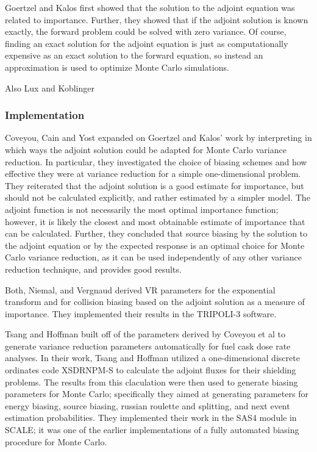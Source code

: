 Goertzel \cite{goertzel_monte_1958} and Kalos \cite{kalos_importance_1963} first
showed that the solution to the adjoint equation was related to importance.
Further, they showed that if the adjoint solution is known exactly, the forward
problem could be solved with zero variance. Of course, finding an exact solution
for the adjoint equation is just as computationally expensive as an exact
solution to the forward equation, so instead an approximation is used to
optimize Monte Carlo simulations.

Also Lux and Koblinger \cite{lux_monte_carlo}

\subsubsection{Implementation}

Coveyou, Cain and Yost \cite{coveyou_adjoint_1967} expanded on Goertzel and
Kalos' work by interpreting in which ways the adjoint solution could be adapted
for Monte Carlo variance reduction. In particular, they investigated the choice
of biasing schemes and how effective they were at variance reduction for a
simple one-dimensional problem. They reiterated that the adjoint solution is a
good estimate for importance, but should not be calculated explicitly, and
rather estimated by a simpler model. The adjoint function is not necessarily the
most optimal importance function; however, it is likely the closest and most
obtainable estimate of importance that can be calculated. Further, they
concluded that source biasing by the solution to the adjoint equation or by the
expected response is an optimal choice for Monte Carlo variance reduction, as it
can be used independently of any other variance reduction technique, and
provides good results.

Both, Niemal, and Vergnaud \cite{both_automated_1990} derived VR parameters for
the exponential transform and for collision biasing based on the adjoint
solution as a measure of importance. They implemented their results in the
TRIPOLI-3 software.

Tsang and Hoffman \cite{tsang_monte_1988} built off of the parameters derived by
Coveyou et al \cite{coveyou_adjoint_1967} to generate variance reduction
parameters automatically for fuel cask dose rate analyses. In their work, Tsang
and Hoffman utilized a one-dimensional discrete ordinates code XSDRNPM-S to
calculate the adjoint fluxes for their shielding problems. The results from this
claculation were then used to generate biasing parameters for Monte Carlo;
specifically they aimed at generating parameters for energy biasing, source
biasing, russian roulette and splitting, and next event estimation
probabilities. They implemented their work in the SAS4 module in SCALE; it was
one of the earlier implementations of a fully automated biasing procedure for
Monte Carlo.


